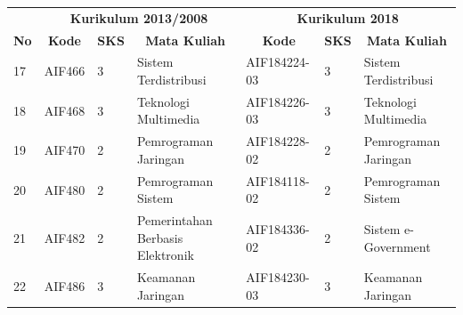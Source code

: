 \begin{table}[H]
\centering
\label{tab:aturankonversipilihan_4}
\begin{tabular}{|p{0.35cm}|p{2cm}|p{0.55cm}|p{3.45cm}|p{2.65cm}|p{0.55cm}|p{3.45cm}|}
\hline
\multicolumn{1}{|c|}{} & \multicolumn{3}{c|}{\textbf{Kurikulum 2013/2008}} & \multicolumn{3}{c|}{\textbf{Kurikulum 2018}} \\ \cline{2-7} 
\multicolumn{1}{|c|}{\multirow{-2}{*}{\textbf{No}}} & \multicolumn{1}{c|}{\textbf{Kode}} & \multicolumn{1}{c|}{\textbf{SKS}} & \multicolumn{1}{c|}{\textbf{Mata Kuliah}} & \multicolumn{1}{c|}{\textbf{Kode}} & \multicolumn{1}{c|}{\textbf{SKS}} & \multicolumn{1}{c|}{\textbf{Mata Kuliah}} \\ \hline
17 & AIF466 & 3 & Sistem Terdistribusi & AIF184224-03 & 3 & Sistem Terdistribusi \\ \hline
18 & AIF468 & 3 & Teknologi Multimedia & AIF184226-03 & 3 & Teknologi Multimedia \\ \hline
19 & AIF470 & 2 & Pemrograman Jaringan & AIF184228-02 & 2 & Pemrograman Jaringan \\ \hline
20 & AIF480 & 2 & Pemrograman Sistem & AIF184118-02 & 2 & Pemrograman Sistem \\ \hline
21 & AIF482 & 2 & Pemerintahan Berbasis Elektronik & AIF184336-02 & 2 & Sistem e-Government \\ \hline
22 & AIF486 & 3 & Keamanan Jaringan & AIF184230-03 & 3 & Keamanan Jaringan \\ \hline
\end{tabular}
\end{table}